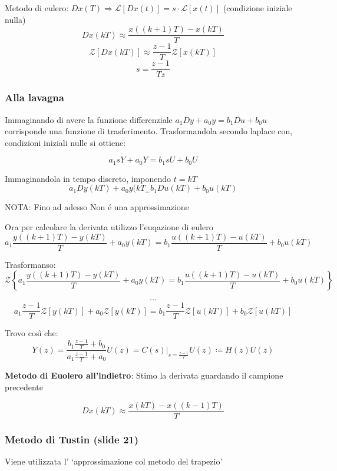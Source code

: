 \documentclass{article}
\begin{document}
Metodo di eulero: $Dx(T) \Rightarrow \mathcal{L}[Dx(t)] = s\cdot\mathcal{L}[x(t)]$ (condizione iniziale nulla)
\[ Dx(kT) \approx \frac{x((k+1)T) - x(kT)}{T}\]
\[ \mathcal{Z}[Dx(kT)]  \approx \frac{z-1}{T}\mathcal{Z}[x(kT)]\]
\[ s = \frac{z-1}{Tz}\]

\subsubsection{Alla lavagna}

Immaginando di avere la funzione differenziale $a_1 Dy + a_0y = b_1Du + b_0u$ corrisponde una funzione di trasferimento.
Trasformandola secondo laplace con, condizioni iniziali nulle si ottiene:

\[ a_1 sY + a_0 Y = b_1 sU + b_0 U \]

Immaginandola in tempo discreto, imponendo $t = kT$
\[ a_1 Dy(kT) + a_0 y(kT_ = b_1 Du(kT) + b_0u(kT) \]

NOTA: Fino ad adesso Non \'e una approssimazione

Ora per calcolare la derivata utilizzo l'euqazione di eulero
\[ a_1 \frac{y((k+1)T) - y(kT)}{T} + a_0 y(kT) = b_1\frac{u((k+1)T) - u(kT)}{T} + b_0u(kT)\]

Trasformanso:
\[ \mathcal{Z}\left\{a_1 \frac{y((k+1)T) - y(kT)}{T} + a_0 y(kT) = b_1\frac{u((k+1)T) - u(kT)}{T} + b_0u(kT)\right\}\]

\[ \cdots\]
\[ a_1 \frac{z-1}{T} \mathcal{Z}[y(kT)] + a_0 \mathcal{Z}[y(kT)] = b_1 \frac{z-1}{T} \mathcal{Z}[u(kT)] + b_0 \mathcal{Z}[u(kT)]\]

Trovo cos\`i che:
\[ Y(z) = \frac{b_1\frac{z-1}{T} + b_0}{a_1\frac{z-1}{T} + a_0} U(z) = \left.C(s)\right|_{s=\frac{z-1}{T}} U(z) \coloneqq H(z)U(z)\]

\bigbreak

\textbf{Metodo di Euolero all'indietro}: Stimo la derivata guardando il campione precedente

\[ Dx(kT) \approx \frac{x(kT) - x((k-1)T)}{T}\]

\subsubsection{Metodo di Tustin (slide 21)}
Viene utilizzata l' `approssimazione col metodo del trapezio'

\end{document}
